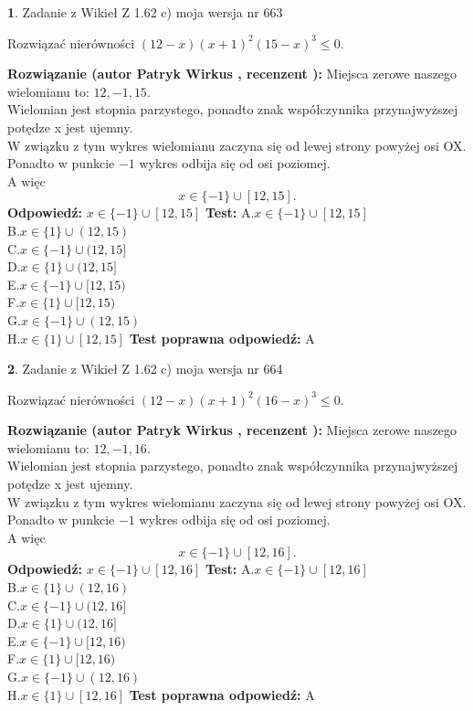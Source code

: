 \documentclass[12pt, a4paper]{article}
\theoremstyle{definition} %
\newtheorem{zad}{}
\newcommand{\zadStart}[1]{\begin{zad}#1\newline}
\newcommand{\zadStop}{\end{zad}}
\newcommand{\rozwStart}[2]{\noindent \textbf{Rozwiązanie (autor #1 , recenzent #2): }\newline}
\newcommand{\rozwStop}{\newline}
\newcommand{\odpStart}{\noindent \textbf{Odpowiedź:}\newline}
\newcommand{\odpStop}{\newline}
\newcommand{\testStart}{\noindent \textbf{Test:}\newline}
\newcommand{\testStop}{\newline}
\newcommand{\kluczStart}{\noindent \textbf{Test poprawna odpowiedź:}\newline}
\newcommand{\kluczStop}{\newline}
\begin{document}
\zadStart{Zadanie z Wikieł Z 1.62 c) moja wersja nr 663}

Rozwiązać nierówności $(12-x)(x+1)^{2}(15-x)^{3}\le0$.
\zadStop
\rozwStart{Patryk Wirkus}{}
Miejsca zerowe naszego wielomianu to: $12, -1, 15$.\\
Wielomian jest stopnia parzystego, ponadto znak współczynnika przy\linebreak najwyższej potędze x jest ujemny.\\ W związku z tym wykres wielomianu zaczyna się od lewej strony powyżej osi OX.\\
Ponadto w punkcie $-1$ wykres odbija się od osi poziomej.\\
A więc $$x \in \{-1\} \cup [12,15].$$
\rozwStop
\odpStart
$x \in \{-1\} \cup [12,15]$
\odpStop
\testStart
A.$x \in \{-1\} \cup [12,15]$\\
B.$x \in \{1\} \cup (12,15)$\\
C.$x \in \{-1\} \cup (12,15]$\\
D.$x \in \{1\} \cup (12,15]$\\
E.$x \in \{-1\} \cup [12,15)$\\
F.$x \in \{1\} \cup [12,15)$\\
G.$x \in \{-1\} \cup (12,15)$\\
H.$x \in \{1\} \cup [12,15]$
\testStop
\kluczStart
A
\kluczStop



\zadStart{Zadanie z Wikieł Z 1.62 c) moja wersja nr 664}

Rozwiązać nierówności $(12-x)(x+1)^{2}(16-x)^{3}\le0$.
\zadStop
\rozwStart{Patryk Wirkus}{}
Miejsca zerowe naszego wielomianu to: $12, -1, 16$.\\
Wielomian jest stopnia parzystego, ponadto znak współczynnika przy\linebreak najwyższej potędze x jest ujemny.\\ W związku z tym wykres wielomianu zaczyna się od lewej strony powyżej osi OX.\\
Ponadto w punkcie $-1$ wykres odbija się od osi poziomej.\\
A więc $$x \in \{-1\} \cup [12,16].$$
\rozwStop
\odpStart
$x \in \{-1\} \cup [12,16]$
\odpStop
\testStart
A.$x \in \{-1\} \cup [12,16]$\\
B.$x \in \{1\} \cup (12,16)$\\
C.$x \in \{-1\} \cup (12,16]$\\
D.$x \in \{1\} \cup (12,16]$\\
E.$x \in \{-1\} \cup [12,16)$\\
F.$x \in \{1\} \cup [12,16)$\\
G.$x \in \{-1\} \cup (12,16)$\\
H.$x \in \{1\} \cup [12,16]$
\testStop
\kluczStart
A
\kluczStop
\end{document}
